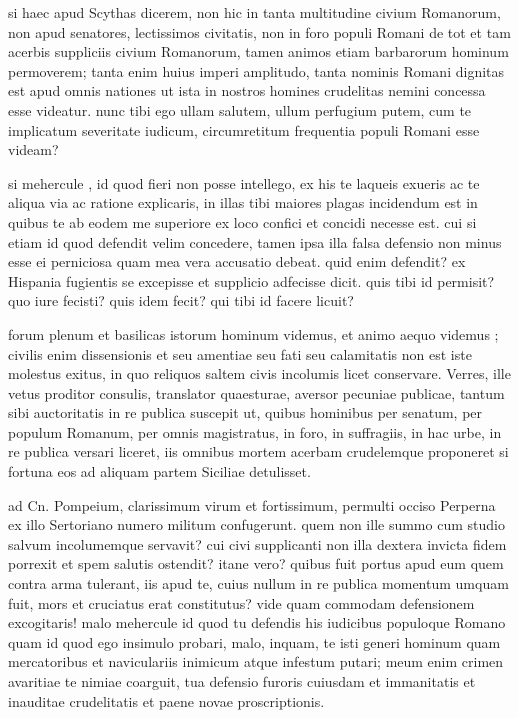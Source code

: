  si haec apud Scythas dicerem, non hic in tanta multitudine civium Romanorum, non apud senatores, lectissimos civitatis, non in foro populi Romani de tot et tam acerbis suppliciis civium Romanorum, tamen animos etiam barbarorum hominum permoverem; tanta enim huius imperi amplitudo, tanta nominis Romani dignitas est apud omnis nationes ut ista in nostros homines crudelitas nemini concessa esse videatur. nunc tibi ego ullam salutem, ullum perfugium putem, cum te implicatum severitate iudicum, circumretitum frequentia populi Romani esse videam?

 si mehercule , id quod fieri non posse intellego, ex his te laqueis exueris ac te aliqua via ac ratione explicaris, in illas tibi maiores plagas incidendum est in quibus te ab eodem me superiore ex loco confici et concidi necesse est. cui si etiam id quod defendit velim concedere, tamen ipsa illa falsa defensio non minus esse ei perniciosa quam mea vera accusatio debeat. quid enim defendit? ex Hispania fugientis se excepisse et supplicio adfecisse dicit. quis tibi id permisit? quo iure fecisti? quis idem fecit? qui tibi id facere licuit?

 forum plenum et basilicas istorum hominum videmus, et animo aequo videmus ; civilis enim dissensionis et seu amentiae seu fati seu calamitatis non est iste molestus exitus, in quo reliquos saltem civis incolumis licet conservare. Verres, ille vetus proditor consulis, translator quaesturae, aversor pecuniae publicae, tantum sibi auctoritatis in re publica suscepit ut, quibus hominibus per senatum, per populum Romanum, per omnis magistratus, in foro, in suffragiis, in hac urbe, in re publica versari liceret, iis omnibus mortem acerbam crudelemque proponeret si fortuna eos ad aliquam partem Siciliae detulisset.

 ad Cn. Pompeium, clarissimum virum et fortissimum, permulti occiso Perperna ex illo Sertoriano numero militum confugerunt. quem non ille summo cum studio salvum incolumemque servavit? cui civi supplicanti non illa dextera invicta fidem porrexit et spem salutis ostendit? itane vero? quibus fuit portus apud eum quem contra arma tulerant, iis apud te, cuius nullum in re publica momentum umquam fuit, mors et cruciatus erat constitutus? vide quam commodam defensionem excogitaris! malo mehercule id quod tu defendis his iudicibus populoque Romano quam id quod ego insimulo probari, malo, inquam, te isti generi hominum quam mercatoribus et naviculariis inimicum atque infestum putari; meum enim crimen avaritiae te nimiae coarguit, tua defensio furoris cuiusdam et immanitatis et inauditae crudelitatis et paene novae proscriptionis.

